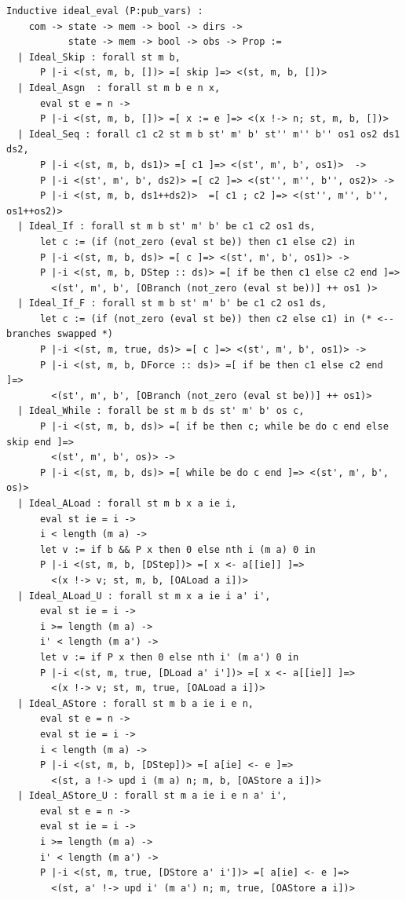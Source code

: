 \documentclass[12pt]{report}
\begin{document}
\begin{verbatim}
Inductive ideal_eval (P:pub_vars) :
    com -> state -> mem -> bool -> dirs ->
           state -> mem -> bool -> obs -> Prop :=
  | Ideal_Skip : forall st m b,
      P |-i <(st, m, b, [])> =[ skip ]=> <(st, m, b, [])>
  | Ideal_Asgn  : forall st m b e n x,
      eval st e = n ->
      P |-i <(st, m, b, [])> =[ x := e ]=> <(x !-> n; st, m, b, [])>
  | Ideal_Seq : forall c1 c2 st m b st' m' b' st'' m'' b'' os1 os2 ds1 ds2,
      P |-i <(st, m, b, ds1)> =[ c1 ]=> <(st', m', b', os1)>  ->
      P |-i <(st', m', b', ds2)> =[ c2 ]=> <(st'', m'', b'', os2)> ->
      P |-i <(st, m, b, ds1++ds2)>  =[ c1 ; c2 ]=> <(st'', m'', b'', os1++os2)>
  | Ideal_If : forall st m b st' m' b' be c1 c2 os1 ds,
      let c := (if (not_zero (eval st be)) then c1 else c2) in
      P |-i <(st, m, b, ds)> =[ c ]=> <(st', m', b', os1)> ->
      P |-i <(st, m, b, DStep :: ds)> =[ if be then c1 else c2 end ]=>
        <(st', m', b', [OBranch (not_zero (eval st be))] ++ os1 )>
  | Ideal_If_F : forall st m b st' m' b' be c1 c2 os1 ds,
      let c := (if (not_zero (eval st be)) then c2 else c1) in (* <-- branches swapped *)
      P |-i <(st, m, true, ds)> =[ c ]=> <(st', m', b', os1)> ->
      P |-i <(st, m, b, DForce :: ds)> =[ if be then c1 else c2 end ]=>
        <(st', m', b', [OBranch (not_zero (eval st be))] ++ os1)>
  | Ideal_While : forall be st m b ds st' m' b' os c,
      P |-i <(st, m, b, ds)> =[ if be then c; while be do c end else skip end ]=>
        <(st', m', b', os)> ->
      P |-i <(st, m, b, ds)> =[ while be do c end ]=> <(st', m', b', os)>
  | Ideal_ALoad : forall st m b x a ie i,
      eval st ie = i ->
      i < length (m a) ->
      let v := if b && P x then 0 else nth i (m a) 0 in
      P |-i <(st, m, b, [DStep])> =[ x <- a[[ie]] ]=>
        <(x !-> v; st, m, b, [OALoad a i])>
  | Ideal_ALoad_U : forall st m x a ie i a' i',
      eval st ie = i ->
      i >= length (m a) ->
      i' < length (m a') ->
      let v := if P x then 0 else nth i' (m a') 0 in
      P |-i <(st, m, true, [DLoad a' i'])> =[ x <- a[[ie]] ]=>
        <(x !-> v; st, m, true, [OALoad a i])>
  | Ideal_AStore : forall st m b a ie i e n,
      eval st e = n ->
      eval st ie = i ->
      i < length (m a) ->
      P |-i <(st, m, b, [DStep])> =[ a[ie] <- e ]=>
        <(st, a !-> upd i (m a) n; m, b, [OAStore a i])>
  | Ideal_AStore_U : forall st m a ie i e n a' i',
      eval st e = n ->
      eval st ie = i ->
      i >= length (m a) ->
      i' < length (m a') ->
      P |-i <(st, m, true, [DStore a' i'])> =[ a[ie] <- e ]=>
        <(st, a' !-> upd i' (m a') n; m, true, [OAStore a i])>


\end{verbatim}
\end{document}
